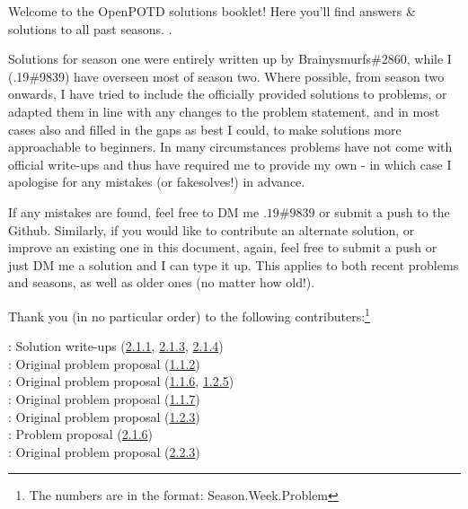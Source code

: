 Welcome to the OpenPOTD solutions booklet! Here you'll find answers \& solutions to all past seasons.\medskip
.

Solutions for season one were entirely written up by Brainysmurfs\#2860, while I (.19\#9839) have overseen most of season two. 
Where possible, from season two onwards, I have tried to include the officially provided solutions to problems, or adapted them in line with any changes to the problem statement, and in most cases also and filled in the gaps as best I could, to make solutions more approachable to beginners. 
In many circumstances problems have not come with official write-ups and thus have required me to provide my own - in which case I apologise for any mistakes (or fakesolves!) in advance.\medskip

If any mistakes are found, feel free to DM me \(.19\#9839\) or submit a push to the Github.
Similarly, if you would like to contribute an alternate solution, or improve an existing one in this document, again, feel free to submit a push or just DM me a solution and I can type it up. 
This applies to both recent problems and seasons, as well as older ones (no matter how old!).\bigskip 


Thank you (in no particular order) to the following contributers:\footnote{The numbers are in the format: Season.Week.Problem}\medskip

\Paiya: Solution write-ups (\hyperref[2-1-1]{2.1.1}, \hyperref[2-1-3]{2.1.3}, \hyperref[2-1-4]{2.1.4})\\
\Ptony: Original problem proposal (\hyperref[1-1-2]{1.1.2})\\
\Ppi: Original problem proposal (\hyperref[1-1-6]{1.1.6}, \hyperref[1-2-5]{1.2.5})\\
\Pbfan: Original problem proposal (\hyperref[1-1-7]{1.1.7})\\
\Pkiesh: Original problem proposal (\hyperref[1-2-3]{1.2.3})\\
\Pchris: Problem proposal (\hyperref[2-1-6]{2.1.6})\\
\Pkee: Original problem proposal (\hyperref[2-2-3]{2.2.3})\\
\medskip